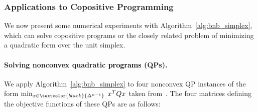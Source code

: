 \documentclass[12pt]{article}
\newcommand{\reals}{\mathbb{R}}
\newcommand{\st}{\text{s.t.}}
\newcommand{\mcC}{\mathcal{C}}
\newcommand{\mcV}{\mathcal{V}}
\theoremstyle{remark}
\begin{document}
\subsubsection{Applications to Copositive Programming}\label{sec:num_cop}


We now present some numerical experiments with Algorithm~\ref{alg:bnb_simplex}, which can solve copositive programs or the closely related problem of minimizing a quadratic form over the unit simplex.


\paragraph{Solving nonconvex quadratic \textcolor{black}{programs} (QPs).}



We apply Algorithm~\ref{alg:bnb_simplex} to four nonconvex QP instances of the form $\min_{x\in\textcolor{black}{\Delta^{n-1}}}\; x^TQx$ taken from~\cite{Bundfuss2009}.
The four matrices defining the objective functions of these QPs are as follows:
\allowdisplaybreaks
\end{document}

